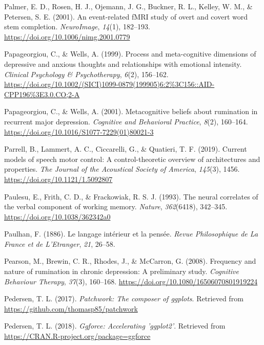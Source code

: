 \documentclass[a4paper,12pt,twoside,onecolumn,openright,final,oldfontcommands]{memoir}
\begin{document}
\leavevmode\hypertarget{ref-palmer_event-related_2001}{}%
Palmer, E. D., Rosen, H. J., Ojemann, J. G., Buckner, R. L., Kelley, W. M., \& Petersen, S. E. (2001). An event-related fMRI study of overt and covert word stem completion. \emph{NeuroImage}, \emph{14}(1), 182--193. \url{https://doi.org/10.1006/nimg.2001.0779}

\leavevmode\hypertarget{ref-papageorgiou_process_1999}{}%
Papageorgiou, C., \& Wells, A. (1999). Process and meta-cognitive dimensions of depressive and anxious thoughts and relationships with emotional intensity. \emph{Clinical Psychology \& Psychotherapy}, \emph{6}(2), 156--162. \url{https://doi.org/10.1002/(SICI)1099-0879(199905)6:2\%3C156::AID-CPP196\%3E3.0.CO;2-A}

\leavevmode\hypertarget{ref-papageorgiou_metacognitive_2001}{}%
Papageorgiou, C., \& Wells, A. (2001). Metacognitive beliefs about rumination in recurrent major depression. \emph{Cognitive and Behavioral Practice}, \emph{8}(2), 160--164. \url{https://doi.org/10.1016/S1077-7229(01)80021-3}

\leavevmode\hypertarget{ref-parrell_current_2019}{}%
Parrell, B., Lammert, A. C., Ciccarelli, G., \& Quatieri, T. F. (2019). Current models of speech motor control: A control-theoretic overview of architectures and properties. \emph{The Journal of the Acoustical Society of America}, \emph{145}(3), 1456. \url{https://doi.org/10.1121/1.5092807}

\leavevmode\hypertarget{ref-paulesu_neural_1993}{}%
Paulesu, E., Frith, C. D., \& Frackowiak, R. S. J. (1993). The neural correlates of the verbal component of working memory. \emph{Nature}, \emph{362}(6418), 342--345. \url{https://doi.org/10.1038/362342a0}

\leavevmode\hypertarget{ref-paulhan_langage_1886}{}%
Paulhan, F. (1886). Le langage intérieur et la pensée. \emph{Revue Philosophique de La France et de L'Etranger}, \emph{21}, 26--58.

\leavevmode\hypertarget{ref-pearson_frequency_2008}{}%
Pearson, M., Brewin, C. R., Rhodes, J., \& McCarron, G. (2008). Frequency and nature of rumination in chronic depression: A preliminary study. \emph{Cognitive Behaviour Therapy}, \emph{37}(3), 160--168. \url{https://doi.org/10.1080/16506070801919224}

\leavevmode\hypertarget{ref-R-patchwork}{}%
Pedersen, T. L. (2017). \emph{Patchwork: The composer of ggplots}. Retrieved from \url{https://github.com/thomasp85/patchwork}

\leavevmode\hypertarget{ref-R-ggforce}{}%
Pedersen, T. L. (2018). \emph{Ggforce: Accelerating 'ggplot2'}. Retrieved from \url{https://CRAN.R-project.org/package=ggforce}
\end{document}
